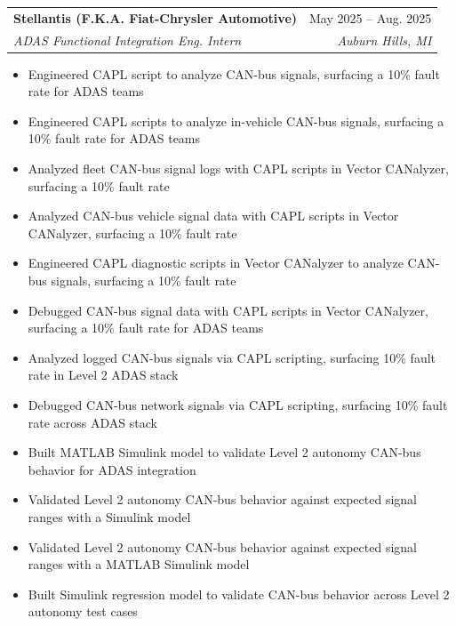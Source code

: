 \documentclass[letterpaper,11pt]{article}
\makeatletter
\newcommand{\resumeItem}[1]{
  \item\small{
    {#1 \vspace{-2pt}}
  }
}
\newcommand{\resumeSubheading}[4]{
  \vspace{-2pt}\item
    \begin{tabular*}{0.97\textwidth}[t]{l@{\extracolsep{\fill}}r}
      \textbf{#1} & #2 \\
      \textit{\small#3} & \textit{\small #4} \\
    \end{tabular*}\vspace{-7pt}
}
\newcommand{\resumeItemListStart}{\begin{itemize}}
\newcommand{\resumeItemListEnd}{\end{itemize}\vspace{-5pt}}
\makeatother
\begin{document}
    \resumeSubheading
      {Stellantis (F.K.A. Fiat-Chrysler Automotive)}{May 2025 -- Aug. 2025}
      {ADAS Functional Integration Eng. Intern}{Auburn Hills, MI}
      \resumeItemListStart
        \resumeItem{Engineered CAPL script to analyze CAN-bus signals, surfacing a 10\% fault rate for ADAS teams}
        \resumeItem{Engineered CAPL scripts to analyze in-vehicle CAN-bus signals, surfacing a 10\% fault rate for ADAS teams}
        \resumeItem{Analyzed fleet CAN-bus signal logs with CAPL scripts in Vector CANalyzer, surfacing a 10\% fault rate}
        \resumeItem{Analyzed CAN-bus vehicle signal data with CAPL scripts in Vector CANalyzer, surfacing a 10\% fault rate}
        \resumeItem{Engineered CAPL diagnostic scripts in Vector CANalyzer to analyze CAN-bus signals, surfacing a 10\% fault rate}
        \resumeItem{Debugged CAN-bus signal data with CAPL scripts in Vector CANalyzer, surfacing a 10\% fault rate for ADAS teams}
        \resumeItem{Analyzed logged CAN-bus signals via CAPL scripting, surfacing 10\% fault rate in Level 2 ADAS stack}
        \resumeItem{Debugged CAN-bus network signals via CAPL scripting, surfacing 10\% fault rate across ADAS stack}
        \resumeItem{Built MATLAB Simulink model to validate Level 2 autonomy CAN-bus behavior for ADAS integration}
        \resumeItem{Validated Level 2 autonomy CAN-bus behavior against expected signal ranges with a Simulink model}
        \resumeItem{Validated Level 2 autonomy CAN-bus behavior against expected signal ranges with a MATLAB Simulink model}
        \resumeItem{Built Simulink regression model to validate CAN-bus behavior across Level 2 autonomy test cases}
      \resumeItemListEnd
\end{document}
